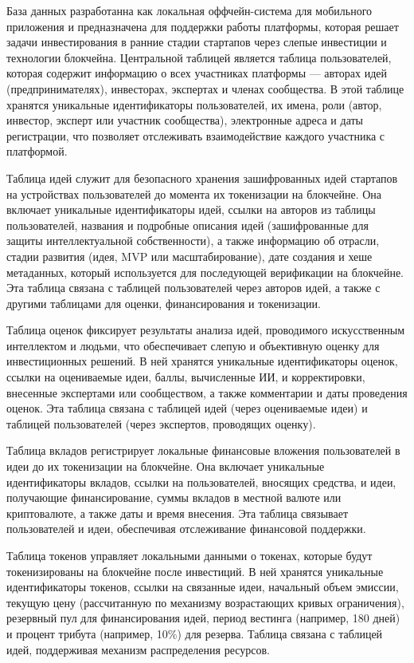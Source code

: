 \documentclass[
    14pt,
    specialist,
    candidate, %
    subf, %
    href,
    dotsinheaders=false
]{disser}
\begin{document}
База данных разработанна как локальная оффчейн-система для мобильного приложения и предназначена для поддержки работы платформы, которая решает задачи инвестирования в ранние стадии стартапов через слепые инвестиции и технологии блокчейна. Центральной таблицей является таблица пользователей, которая содержит информацию о всех участниках платформы — авторах идей (предпринимателях), инвесторах, экспертах и членах сообщества. В этой таблице хранятся уникальные идентификаторы пользователей, их имена, роли (автор, инвестор, эксперт или участник сообщества), электронные адреса и даты регистрации, что позволяет отслеживать взаимодействие каждого участника с платформой.

Таблица идей служит для безопасного хранения зашифрованных идей стартапов на устройствах пользователей до момента их токенизации на блокчейне. Она включает уникальные идентификаторы идей, ссылки на авторов из таблицы пользователей, названия и подробные описания идей (зашифрованные для защиты интеллектуальной собственности), а также информацию об отрасли, стадии развития (идея, MVP или масштабирование), дате создания и хеше метаданных, который используется для последующей верификации на блокчейне. Эта таблица связана с таблицей пользователей через авторов идей, а также с другими таблицами для оценки, финансирования и токенизации.

Таблица оценок фиксирует результаты анализа идей, проводимого искусственным интеллектом и людьми, что обеспечивает слепую и объективную оценку для инвестиционных решений. В ней хранятся уникальные идентификаторы оценок, ссылки на оцениваемые идеи, баллы, вычисленные ИИ, и корректировки, внесенные экспертами или сообществом, а также комментарии и даты проведения оценок. Эта таблица связана с таблицей идей (через оцениваемые идеи) и таблицей пользователей (через экспертов, проводящих оценку).

Таблица вкладов регистрирует локальные финансовые вложения пользователей в идеи до их токенизации на блокчейне. Она включает уникальные идентификаторы вкладов, ссылки на пользователей, вносящих средства, и идеи, получающие финансирование, суммы вкладов в местной валюте или криптовалюте, а также даты и время внесения. Эта таблица связывает пользователей и идеи, обеспечивая отслеживание финансовой поддержки.

Таблица токенов управляет локальными данными о токенах, которые будут токенизированы на блокчейне после инвестиций. В ней хранятся уникальные идентификаторы токенов, ссылки на связанные идеи, начальный объем эмиссии, текущую цену (рассчитанную по механизму возрастающих кривых ограничения), резервный пул для финансирования идей, период вестинга (например, 180 дней) и процент трибута (например, 10\%) для резерва. Таблица связана с таблицей идей, поддерживая механизм распределения ресурсов.
\end{document}
